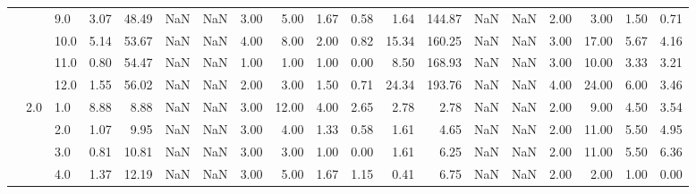 \begin{tabular}{lllrrrrrrrrrrrrrrrr}
       &     & 9.0  &      3.07 &      48.49 &               NaN &                NaN &  3.00 &   5.00 &             1.67 &                         0.58 &      1.64 &     144.87 &               NaN &                NaN & 2.00 &   3.00 &             1.50 &                         0.71 \\
       &     & 10.0 &      5.14 &      53.67 &               NaN &                NaN &  4.00 &   8.00 &             2.00 &                         0.82 &     15.34 &     160.25 &               NaN &                NaN & 3.00 &  17.00 &             5.67 &                         4.16 \\
       &     & 11.0 &      0.80 &      54.47 &               NaN &                NaN &  1.00 &   1.00 &             1.00 &                         0.00 &      8.50 &     168.93 &               NaN &                NaN & 3.00 &  10.00 &             3.33 &                         3.21 \\
       &     & 12.0 &      1.55 &      56.02 &               NaN &                NaN &  2.00 &   3.00 &             1.50 &                         0.71 &     24.34 &     193.76 &               NaN &                NaN & 4.00 &  24.00 &             6.00 &                         3.46 \\
       & 2.0 & 1.0  &      8.88 &       8.88 &               NaN &                NaN &  3.00 &  12.00 &             4.00 &                         2.65 &      2.78 &       2.78 &               NaN &                NaN & 2.00 &   9.00 &             4.50 &                         3.54 \\
       &     & 2.0  &      1.07 &       9.95 &               NaN &                NaN &  3.00 &   4.00 &             1.33 &                         0.58 &      1.61 &       4.65 &               NaN &                NaN & 2.00 &  11.00 &             5.50 &                         4.95 \\
       &     & 3.0  &      0.81 &      10.81 &               NaN &                NaN &  3.00 &   3.00 &             1.00 &                         0.00 &      1.61 &       6.25 &               NaN &                NaN & 2.00 &  11.00 &             5.50 &                         6.36 \\
       &     & 4.0  &      1.37 &      12.19 &               NaN &                NaN &  3.00 &   5.00 &             1.67 &                         1.15 &      0.41 &       6.75 &               NaN &                NaN & 2.00 &   2.00 &             1.00 &                         0.00 \\

\end{tabular}
